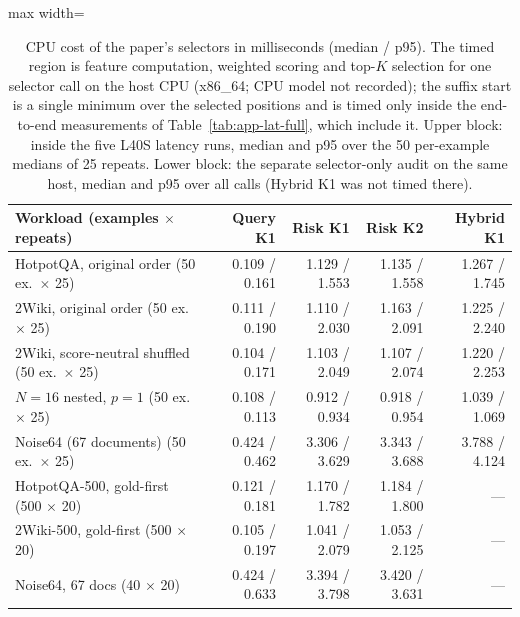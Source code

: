 \begin{table}[t]
\centering
\footnotesize
\begin{adjustbox}{max width=\textwidth}
\begin{tabular}{lrrrr}
\toprule
Workload (examples $\times$ repeats) & Query K1 & Risk K1 & Risk K2 & Hybrid K1 \\
\midrule
HotpotQA, original order (50 ex.\ $\times$ 25) & 0.109 / 0.161 & 1.129 / 1.553 & 1.135 / 1.558 & 1.267 / 1.745 \\
2Wiki, original order (50 ex.\ $\times$ 25) & 0.111 / 0.190 & 1.110 / 2.030 & 1.163 / 2.091 & 1.225 / 2.240 \\
2Wiki, score-neutral shuffled (50 ex.\ $\times$ 25) & 0.104 / 0.171 & 1.103 / 2.049 & 1.107 / 2.074 & 1.220 / 2.253 \\
$N{=}16$ nested, $p{=}1$ (50 ex.\ $\times$ 25) & 0.108 / 0.113 & 0.912 / 0.934 & 0.918 / 0.954 & 1.039 / 1.069 \\
Noise64 (67 documents) (50 ex.\ $\times$ 25) & 0.424 / 0.462 & 3.306 / 3.629 & 3.343 / 3.688 & 3.788 / 4.124 \\
\midrule
HotpotQA-500, gold-first (500 $\times$ 20) & 0.121 / 0.181 & 1.170 / 1.782 & 1.184 / 1.800 & --- \\
2Wiki-500, gold-first (500 $\times$ 20) & 0.105 / 0.197 & 1.041 / 2.079 & 1.053 / 2.125 & --- \\
Noise64, 67 docs (40 $\times$ 20) & 0.424 / 0.633 & 3.394 / 3.798 & 3.420 / 3.631 & --- \\
\bottomrule
\end{tabular}
\end{adjustbox}
\caption{CPU cost of the paper's selectors in milliseconds (median / p95). The timed region is feature computation, weighted scoring and top-$K$ selection for one selector call on the host CPU (x86\_64; CPU model not recorded); the suffix start is a single minimum over the selected positions and is timed only inside the end-to-end measurements of Table~\ref{tab:app-lat-full}, which include it. Upper block: inside the five L40S latency runs, median and p95 over the 50 per-example medians of 25 repeats. Lower block: the separate selector-only audit on the same host, median and p95 over all calls (Hybrid K1 was not timed there).}
\label{tab:app-plan}
\end{table}
